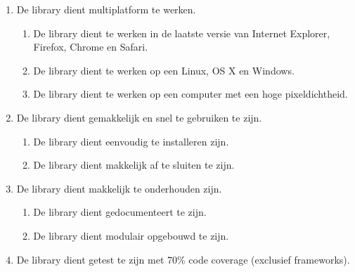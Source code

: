 \begin{enumerate}[label={R\arabic*}]
\setcounter{enumi}{\value{startvalue}}
	\item \label{req:multiplatform} De library dient multiplatform te werken.
	\begin{enumerate}[label={R\arabic{enumi}.\arabic*}]
		\item De library dient te werken in de laatste versie van Internet Explorer, Firefox, Chrome en Safari.
		\item De library dient te werken op een Linux, OS X en Windows.
		\item De library dient te werken op een computer met een hoge pixeldichtheid.
	\end{enumerate}
	\item \label{req:performance} De library dient gemakkelijk en snel te gebruiken te zijn.
	\begin{enumerate}[label={R\arabic{enumi}.\arabic*}]
		\item De library dient eenvoudig te installeren zijn.
		\item De library dient makkelijk af te sluiten te zijn.
	\end{enumerate}
	\item \label{req:maintenance} De library dient makkelijk te onderhouden zijn.
	\begin{enumerate}[label={R\arabic{enumi}.\arabic*}]
		\item De library dient gedocumenteert te zijn.
		\item De library dient modulair opgebouwd te zijn.
	\end{enumerate}
	\item \label{req:coverage} De library dient getest te zijn met 70\% code coverage (exclusief frameworks).
\end{enumerate}